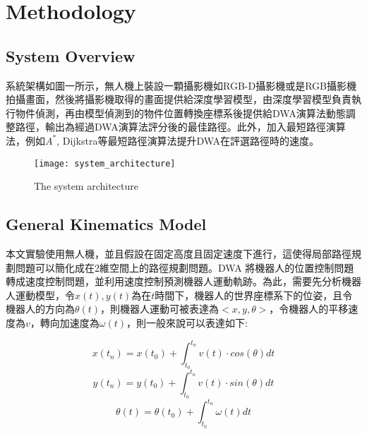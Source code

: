 \documentclass[crop=false]{standalone}
\begin{document}
	\section{Methodology}
	\subsection{System Overview}
	系統架構如圖一所示，無人機上裝設一顆攝影機如RGB-D攝影機或是RGB攝影機拍攝畫面，然後將攝影機取得的畫面提供給深度學習模型，由深度學習模型負責執行物件偵測，再由模型偵測到的物件位置轉換座標系後提供給DWA演算法動態調整路徑，輸出為經過DWA演算法評分後的最佳路徑。此外，加入最短路徑演算法，例如$A^*$, Dijkstra等最短路徑演算法提升DWA在評選路徑時的速度。
	
	\begin{figure*}[thbp!]
		\centering
		\texttt{[image: system\_architecture]}
		\caption{The system architecture}
		\label{fig:system}
	\end{figure*}
	\subsection{General Kinematics Model}
	本文實驗使用無人機，並且假設在固定高度且固定速度下進行，這使得局部路徑規劃問題可以簡化成在2維空間上的路徑規劃問題。DWA 將機器人的位置控制問題轉成速度控制問題，並利用速度控制預測機器人運動軌跡。為此，需要先分析機器人運動模型\cite{fox}，令$x(t), y(t)$為在$t$時間下，機器人的世界座標系下的位姿，且令機器人的方向為$\theta(t)$，則機器人運動可被表達為$<x, y, \theta>$，令機器人的平移速度為$v$，轉向加速度為$\omega(t)$，則一般來說可以表達如下:
	
	\begin{equation}
		x(t_n)=x(t_0)+ \int_{t_0}^{t_n}v(t) \cdot cos(\theta)dt
	\end{equation}
	\begin{equation}
		y(t_n)=y(t_0)+ \int_{t_0}^{t_n}v(t) \cdot sin(\theta)dt
	\end{equation}
	\begin{equation}
		\theta(t)=\theta(t_0)+\int_{t_0}^{t_n}\omega(t)dt
	\end{equation}
	
	
\end{document}
